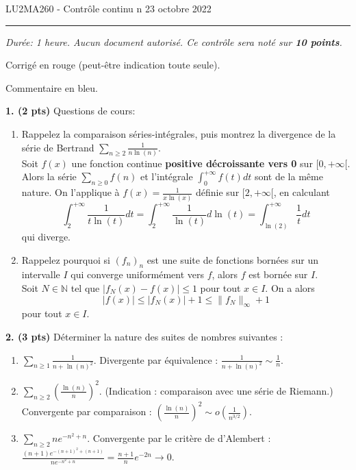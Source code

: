 \documentclass[a4paper,10pt]{article}
\newcommand{\N}{\mathbb{N}}
\newcommand{\R}{\mathbb{R}}
\newcommand{\norm}[1]{\|#1\|}
\newcommand{\abs}[1]{\left|#1\right|}
\newcommand{\correction}[1]{{\color{red}#1}}
\newcommand{\comment}[1]{{\color{blue}#1}}
\begin{document}
\noindent LU2MA260 - Contrôle continu n
\hfill 23 octobre 2022
\medskip\hrule
\vspace{.3in}

\emph{Durée: 1 heure. Aucun document autorisé.
Ce contrôle sera noté sur \textbf{10 points}.}

\correction{Corrigé en rouge (peut-être indication toute seule).}

\comment{Commentaire en bleu.}

\vspace{.1in}

\noindent
\textbf{1. (2 pts)} Questions de cours:

\begin{enumerate}[label=\alph*)]
    \item Rappelez la comparaison séries-intégrales, puis montrez la divergence de la série de Bertrand $\sum_{n\geq 2}\frac{1}{n\ln(n)}$.\\
    \correction{Soit $f(x)$ une fonction continue \textbf{positive décroissante vers 0} sur $[0,+\infty[$. Alors la série $\sum_{n\geq0} f(n)$ et l'intégrale $\int_0^{+\infty} f(t)dt$ sont de la même nature. On l'applique à $f(x)=\frac{1}{x\ln(x)}$ définie sur $[2,+\infty[$, en calculant
    \[\int_2^{+\infty}\frac{1}{t\ln(t)}dt=\int_2^{+\infty}\frac{1}{\ln(t)}d\ln(t)=\int_{\ln(2)}^{+\infty}\frac{1}{t}dt\]
    qui diverge.}
    \item Rappelez pourquoi si $(f_n)_n$ est une suite de fonctions bornées sur un intervalle $I$ qui converge uniformément vers $f$, alors $f$ est bornée sur $I$.\\
    \correction{Soit $N\in\N$ tel que $\abs{f_N(x)-f(x)} \leq 1$ pour tout $x\in I$. On a alors
    \[\abs{f(x)}\leq\abs{f_N(x)}+1\leq\norm{f_N}_\infty+1\]
    pour tout $x\in I$.}
\end{enumerate}

\vspace{.1in}

\noindent
\textbf{2. (3 pts)}
Déterminer la nature des suites de nombres suivantes :

\begin{enumerate}[label=\alph*)]
    \item $\sum_{n\geq1}\frac{1}{n+\ln(n)^2}$.
    \correction{Divergente par équivalence : $\frac{1}{n+\ln(n)^2} \sim \frac{1}{n}$.}
    \item $\sum_{n\geq2}\left(\frac{\ln(n)}{n}\right)^2$. (Indication : comparaison avec une série de Riemann.)\\
    \correction{Convergente par comparaison : $\left(\frac{\ln(n)}{n}\right)^2 \sim o(\frac{1}{n^{3/2}})$.}
    \item $\sum_{n\geq2} n e^{-n^2+n}$.
    \correction{Convergente par le critère de d'Alembert : $\frac{(n+1) e^{-(n+1)^2+(n+1)}}{n e^{-n^2+n}}=\frac{n+1}{n} e^{-2n} \to 0$.}
\end{enumerate}
\end{document}
